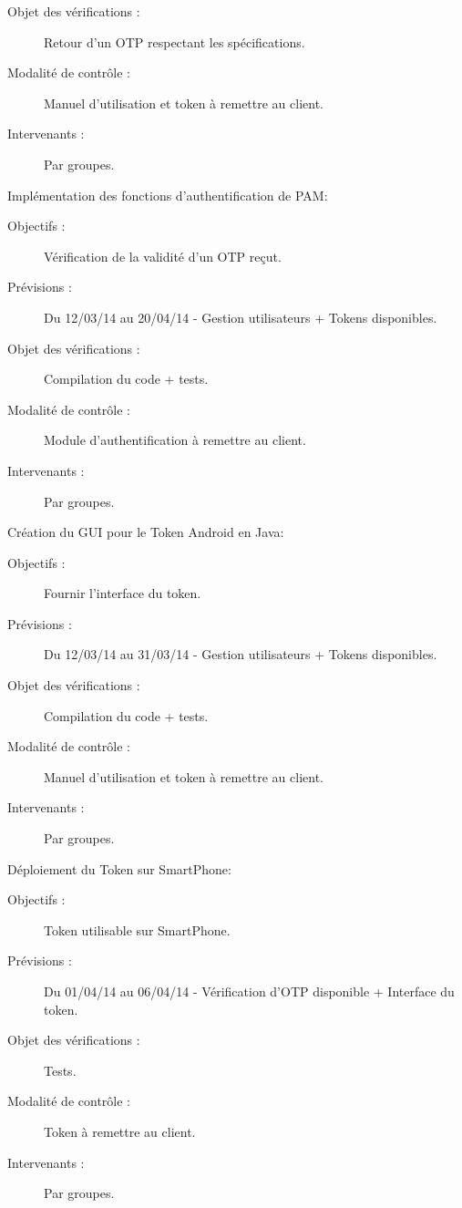 \documentclass{../../res/univ-projet}
\begin{document}
\begin{description}
\begin{description}
		\item[Objet des vérifications :] Retour d'un OTP respectant les spécifications.
		\item[Modalité de contrôle :] Manuel d'utilisation et token à remettre au client.
		\item[Intervenants :] Par groupes.
	\end{description}
	\vfill
	\item Implémentation des fonctions d'authentification de PAM:
	\begin{description}
		\item[Objectifs :] Vérification de la validité d'un OTP reçut.
		\item[Prévisions :] Du 12/03/14 au 20/04/14 - Gestion utilisateurs + Tokens disponibles.
		\item[Objet des vérifications :] Compilation du code + tests.
		\item[Modalité de contrôle :] Module d'authentification à remettre au client.
		\item[Intervenants :] Par groupes.
	\end{description}
	\vfill
	\item Création du GUI pour le Token Android en Java:
	\begin{description}
		\item[Objectifs :] Fournir l'interface du token.
		\item[Prévisions :] Du 12/03/14 au 31/03/14 - Gestion utilisateurs + Tokens disponibles.
		\item[Objet des vérifications :] Compilation du code + tests.
		\item[Modalité de contrôle :] Manuel d'utilisation et token à remettre au client.
		\item[Intervenants :] Par groupes.
	\end{description}
	\vfill
	\item Déploiement du Token sur SmartPhone:
	\begin{description}
		\item[Objectifs :] Token utilisable sur SmartPhone.
		\item[Prévisions :] Du 01/04/14 au 06/04/14 - Vérification d'OTP disponible + Interface du token.
		\item[Objet des vérifications :] Tests.
		\item[Modalité de contrôle :] Token à remettre au client.
		\item[Intervenants :] Par groupes.
	\end{description}

\end{description}
\end{document}
